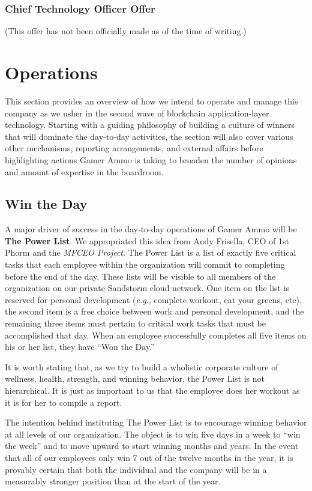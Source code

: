 \documentclass[11pt]{report}
\begin{document}
\subsection{Chief Technology Officer Offer}
\label{cto-offer}{\small (This offer has not been officially made as of the time of writing.)}

\chapter{Operations}
This section provides an overview of how we intend to operate and manage this company as we usher in the second wave of blockchain application-layer technology. Starting with a guiding philosophy of building a culture of winners that will dominate the day-to-day activities, the section will also cover various other mechanisms, reporting arrangements, and external affairs before highlighting actions Gamer Ammo is taking to broaden the number of opinions and amount of expertise in the boardroom.
\section{Win the Day}
A major driver of success in the day-to-day operations of Gamer Ammo will be \textbf{The Power List}. We appropriated this idea from Andy Frisella, CEO of 1st Phorm and the \textit{MFCEO Project}\cite{power-list}. The Power List is a list of exactly five critical tasks that each employee within the organization will commit to completing before the end of the day. These lists will be visible to all members of the organization on our private Sandstorm cloud network. One item on the list is reserved for personal development (\textit{e.g.}, complete workout, eat your greens, etc), the second item is a free choice between work and personal development, and the remaining three items must pertain to critical work tasks that must be accomplished that day. When an employee successfully completes all five items on his or her list, they have ``Won the Day.''

It is worth stating that, as we try to build a wholistic corporate culture of wellness, health, strength, and winning behavior, the Power List is not hierarchical. It is just as important to us that the employee does her workout as it is for her to compile a report.

The intention behind instituting The Power List is to encourage winning behavior at all levels of our organization. The object is to win five days in a week to ``win the week'' and to move upward to start winning months and years. In the event that all of our employees only win 7 out of the twelve months in the year, it is provably certain that both the individual and the company will be in a measurably stronger position than at the start of the year.
\end{document}
